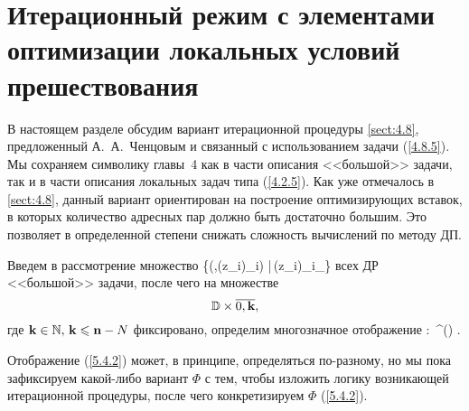 
\section{
  Итерационный режим
  с элементами оптимизации
  локальных условий прешествования
}
\label{sect:5.4}
\setcounter{equation}{0}

В настоящем разделе обсудим вариант итерационной процедуры \ref{sect:4.8},
предложенный А.~А.~Ченцовым и связанный с использованием задачи (\ref{4.8.5}).
Мы сохраняем символику главы~4 как в части описания <<большой>> задачи,
так и в части описания локальных задач типа (\ref{4.2.5}).
Как уже отмечалось в \ref{sect:4.8},
данный вариант ориентирован на построение оптимизирующих вставок,
в которых количество адресных пар должно быть достаточно большим.
Это позволяет в определенной степени снижать сложность вычислений по методу ДП.

Введем в рассмотрение множество
\bfn
  \label{5.4.1}
  \bbd \df \bigl\{\bigl(\al,(z_i)_{i\in{}})\in \ca
  \times {}|\,(z_i)_{i\in{}}\in {}_\al\bigl\}
\efn
всех ДР <<большой>> задачи,
после чего на множестве
$$
  \bbd \times \ov{0,\mathbf{k}}
  ,
$$
где
$\mathbf{k}\in {\mathbb N},\,\mathbf{k}\leqslant {\mathbf n}-N$
фиксировано,
определим многозначное отображение
\bfn
  \label{5.4.2}
  \Phi:\,\bbd\times {}\longrightarrow
  \cp^\prime()
  .
\efn

Отображение (\ref{5.4.2}) может, в принципе, определяться по-разному,
но мы пока зафиксируем какой-либо вариант $\Phi$ с тем,
чтобы изложить логику возникающей итерационной процедуры,
после чего конкретизируем $\Phi$
(\ref{5.4.2}).

